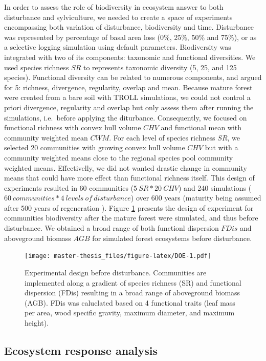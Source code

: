 \documentclass[12pt,]{article}
\theoremstyle{definition}
\theoremstyle{definition}
\theoremstyle{remark}
\begin{document}
In order to assess the role of biodiversity in ecosystem answer to both
disturbance and sylviculture, we needed to create a space of experiments
encompassing both variation of disturbance, biodiversity and time.
Disturbance was represented by percentage of basal area loss (0\%, 25\%,
50\% and 75\%), or as a selective logging simulation using default
parameters. Biodiversity was integrated with two of its components:
taxonomic and functional diversities. We used species richness \(SR\) to
represents taxonomic diversity (5, 25, and 125 species). Functional
diversity can be related to numerous components, and \citet{Borgy2017}
argued for 5: richness, divergence, regularity, overlap and mean.
Because mature forest were created from a bare soil with TROLL
simulations, we could not control a priori divergence, regularity and
overlap but only assess them after running the simulations, i.e.~before
applying the diturbance. Consequently, we focused on functional richness
with convex hull volume \(CHV\) and functional mean with community
weighted mean \(CWM\). For each level of species richness \(SR\), we
selected 20 communities with growing convex hull volume \(CHV\) but with
a community weighted means close to the regional species pool community
weighted means. Effectivelly, we did not wanted drastic change in
community means that could have more effect than functional richness
itself. This design of experiments resulted in 60 communities
(\(5~SR*20~CHV\)) and 240 simulations
(\(60 ~communities*4~levels~of~disturbance\)) over 600 years (maturity
being assumed after 500 years of regeneration \citep{Li}). Figure
\ref{fig:DOE} presents the design of experiment for communities
biodiversity after the mature forest were simulated, and thus before
disturbance. We obtained a broad range of both functionl dispersion
\(FDis\) and aboveground biomass \(AGB\) for simulated forest ecosystems
before disturbance.

\begin{figure}[htbp]
\centering
\texttt{[image: master-thesis\_files/figure-latex/DOE-1.pdf]}
\caption{\label{fig:DOE}Experimental design before disturbance. Communities
are implemented along a gradient of species richness (SR) and functional
dispersion (FDis) resulting in a broad range of aboveground biomass
(AGB). FDis was caluclated based on 4 functional traits (leaf mass per
area, wood specific gravity, maximum diameter, and maximum height).}
\end{figure}

\subsection{Ecosystem response
analysis}\label{ecosystem-response-analysis}
\end{document}

